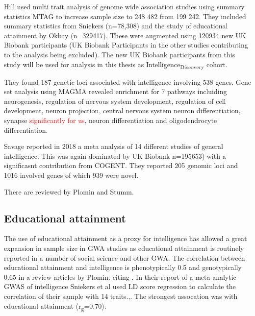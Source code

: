 Hill \cite{hill2019combined} used multi trait analysis of genome wide association studies using summary statistics MTAG\cite{turley2018multi} to increase sample size to 248 482 from 199 242. They included summary statistics from Sniekers (n=78,308)\cite{sniekers2017genome} and the study of educational attainment by Okbay (n=329417). These were augmented using 120934 new UK Biobank participants (UK Biobank Participants in the other studies contributing to the analysis being excluded). The new UK Biobank participants from this study will be used for analysis in this thesis as Intelligence\textsubscript{Discovery} cohort. 

They found 187 genetic loci associated with intelligence involving 538 genes. Gene set analysis using MAGMA revealed enrichment for 7 pathways incluiding  neurogenesis, regulation of nervous system development, regulation of cell development, neuron projection, central nervous system neuron differentiation, synapse \textcolor{red}{significantly for us}, neuron differentiation and oligodendrocyte differentiation. 

Savage \cite{savage2018genome} reported in 2018 a meta analysis of 14 different studies of general intelligence. This was again dominated by UK Biobank n=195653) with a significasnt contribution from COGENT. They reported 205 genomic loci and 1016 involved genes of which 939 were novel. 

There are reviewed by Plomin and Stumm\cite{plomin2018new}.

\subsection{Educational attainment}
\label{sec:Intro Educational Attainment}

The use of educational attainment as a proxy for intelligence has allowed a great expansion in sample size in GWA studies \cite{plomin2018new} as educational attainment is routinely reported in a number of social science and other GWA. The correlation between educational attainment and intelligence is phenotypically 0.5 and genotypically 0.65 in a review articles by Plomin. \cite{plomin2018new} citing  \cite{rietveld2014common}. In their report of a meta-analytic GWAS of intelligence Sniekers et al used LD score regression to calculate the correlation of their sample with 14 traits.\cite{sniekers2017genome},\cite{bulik2015ld}. The strongest assocation was with educational attainment (r\textsubscript{g}=0.70).

